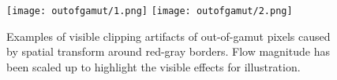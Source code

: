\begin{figure}[H]
    \texttt{[image: outofgamut/1.png]}
    \texttt{[image: outofgamut/2.png]}
    \caption[Examples of visible clipping artifacts of out-of-gamut pixels caused by spatial transform around red-gray borders.]{Examples of visible clipping artifacts of out-of-gamut pixels caused by spatial transform around red-gray borders. Flow magnitude has been scaled up to highlight the visible effects for illustration.}\label{fig:outofgamut}
\end{figure}

